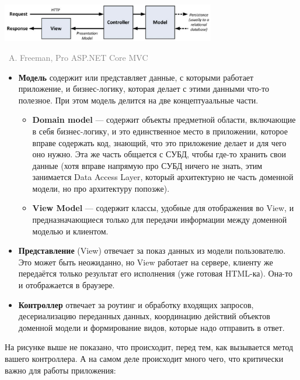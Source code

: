 \documentclass[a5paper]{article}
\newcommand{\attribution}[1] {
\vspace{-5mm}\begin{flushright}\begin{scriptsize}\textcolor{gray}{\textcopyright\, #1}\end{scriptsize}\end{flushright}
}
\begin{document}
\pagebreak

\begin{center}
    \includegraphics[width=0.7\textwidth]{mvc.png}
    \attribution{A. Freeman, Pro ASP.NET Core MVC}
\end{center}

\begin{itemize}
    \item \textbf{Модель} содержит или представляет данные, с которыми работает приложение, и бизнес-логику, которая делает с этими данными что-то полезное. При этом модель делится на две концептуаальные части.
    \begin{itemize}
        \item \textbf{Domain model} --- содержит объекты предметной области, включающие в себя бизнес-логику, и это единственное место в приложении, которое вправе содержать код, знающий, что это приложение делает и для чего оно нужно. Эта же часть общается с СУБД, чтобы где-то хранить свои данные (хотя вправе напрямую про СУБД ничего не знать, этим занимается Data Access Layer, который архитектурно не часть доменной модели, но про архитектуру попозже).
        \item \textbf{View Model} --- содержит классы, удобные для отображения во View, и предназначающиеся только для передачи информации между доменной моделью и клиентом.
    \end{itemize}
    \item \textbf{Представление} (View) отвечает за показ данных из модели пользователю. Это может быть неожиданно, но View работает на сервере, клиенту же передаётся только результат его исполнения (уже готовая HTML-ка). Она-то и отображается в браузере.
    \item \textbf{Контроллер} отвечает за роутинг и обработку входящих запросов, десериализацию переданных данных, координацию действий объектов доменной модели и формирование видов, которые надо отправить в ответ.
\end{itemize}

На рисунке выше не показано, что происходит, перед тем, как вызывается метод вашего контроллера. А на самом деле происходит много чего, что критически важно для работы приложения:
\end{document}
